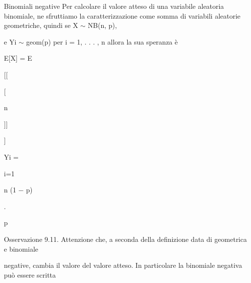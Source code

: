 \documentclass[a4paper,portrait,12pt]{article}
\begin{document}
\begin{flushleft}
Binomiali negative Per calcolare il valore atteso di una variabile aleatoria binomiale, ne sfruttiamo la caratterizzazione come somma di variabili aleatorie geometriche, quindi se X $\sim$ NB(n, p),
\end{flushleft}


\begin{flushleft}
e Yi $\sim$ geom(p) per i = 1, . . . , n allora la sua speranza \`{e}
\end{flushleft}


\begin{flushleft}
E[X] = E
\end{flushleft}





[[


[





\begin{flushleft}
n
\end{flushleft}





]]


]





\begin{flushleft}
Yi =
\end{flushleft}


\begin{flushleft}
i=1
\end{flushleft}





\begin{flushleft}
n (1 $-$ p)
\end{flushleft}


.


\begin{flushleft}
p
\end{flushleft}





\begin{flushleft}
Osservazione 9.11. Attenzione che, a seconda della definizione data di geometrica e binomiale
\end{flushleft}


\begin{flushleft}
negative, cambia il valore del valore atteso. In particolare la binomiale negativa pu\`{o} essere scritta
\end{flushleft}
\end{document}
